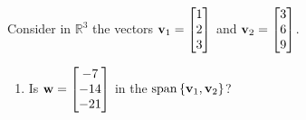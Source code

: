 \begin{example}
   Consider in \( \mathbb{R}^{3} \) the vectors \( \vb{v}_{1} = \begin{bmatrix}
    1\\
    2\\
    3\\
   \end{bmatrix} \) and \( \vb{v}_{2} = \begin{bmatrix}
    3\\
    6\\
    9\\
   \end{bmatrix} \). 
   \begin{enumerate}[label=\textbf{\roman*)}]
    \item Is \( \vb{w}= \begin{bmatrix}
        -7\\
        -14\\
        -21\\
    \end{bmatrix} \) in the \( \mathrm{span} \left\{ \vb{v}_{1}, \vb{v}_{2} \right\} \)?
   \end{enumerate}
\end{example}



